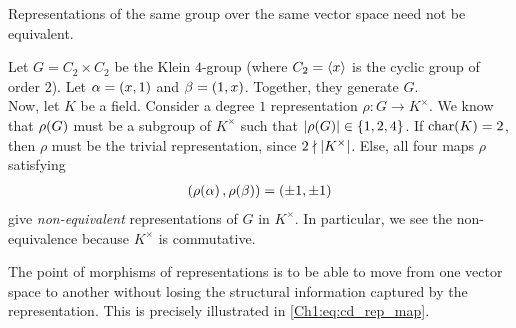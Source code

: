 Representations of the same group over the same vector space need not be equivalent.

\begin{boxexample}
    Let $G = C_2 \times C_2$ be the Klein $4$-group (where $C_2 = \left\langle x \right\rangle$ is the cyclic group of order $2$). Let $\alpha = \left( x, 1 \right)$ and $\beta = \left( 1, x \right)$. Together, they generate $G$. \\

    Now, let $K$ be a field. Consider a degree $1$ representation $\rho : G \to K^\times$. We know that $\rho\!\left( G \right)$ must be a subgroup of $K^\times$ such that $\left\lvert \rho\!\left( G \right) \right\rvert \in \left\{ 1, 2, 4 \right\}$. If $\operatorname{char}\!\left( K \right) = 2$, then $\rho$ must be the trivial representation, since $2 \nmid \left\lvert K^\times \right\rvert$. Else, all four maps $\rho$ satisfying
    \begin{align*}
        \left( \rho\!\left( \alpha \right), \rho\!\left( \beta \right) \right) = \left( \pm 1, \pm 1 \right)
    \end{align*}
    give \textit{non-equivalent} representations of $G$ in $K^\times$. In particular, we see the non-equivalence because $K^\times$ is commutative.
\end{boxexample}

The point of morphisms of representations is to be able to move from one vector space to another without losing the structural information captured by the representation. This is precisely illustrated in \eqref{Ch1:eq:cd_rep_map}.

